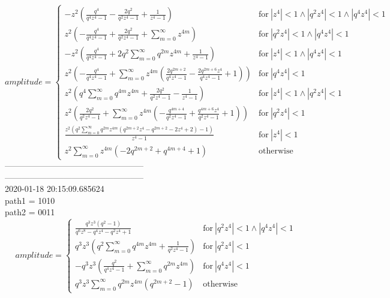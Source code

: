 \documentclass{jsreport}
\begin{document}
$$amplitude = \begin{cases} - z^{2} \left(\frac{q^{4}}{q^{4} z^{4} - 1} - \frac{2 q^{2}}{q^{2} z^{4} - 1} + \frac{1}{z^{4} - 1}\right) & \text{for}\: \left|{z^{4}}\right| < 1 \wedge \left|{q^{2} z^{4}}\right| < 1 \wedge \left|{q^{4} z^{4}}\right| < 1 \\z^{2} \left(- \frac{q^{4}}{q^{4} z^{4} - 1} + \frac{2 q^{2}}{q^{2} z^{4} - 1} + \sum_{m=0}^{\infty} z^{4 m}\right) & \text{for}\: \left|{q^{2} z^{4}}\right| < 1 \wedge \left|{q^{4} z^{4}}\right| < 1 \\- z^{2} \left(\frac{q^{4}}{q^{4} z^{4} - 1} + 2 q^{2} \sum_{m=0}^{\infty} q^{2 m} z^{4 m} + \frac{1}{z^{4} - 1}\right) & \text{for}\: \left|{z^{4}}\right| < 1 \wedge \left|{q^{4} z^{4}}\right| < 1 \\z^{2} \left(- \frac{q^{4}}{q^{4} z^{4} - 1} + \sum_{m=0}^{\infty} z^{4 m} \left(\frac{2 q^{2 m + 2}}{q^{4} z^{4} - 1} - \frac{2 q^{2 m + 6} z^{4}}{q^{4} z^{4} - 1} + 1\right)\right) & \text{for}\: \left|{q^{4} z^{4}}\right| < 1 \\z^{2} \left(q^{4} \sum_{m=0}^{\infty} q^{4 m} z^{4 m} + \frac{2 q^{2}}{q^{2} z^{4} - 1} - \frac{1}{z^{4} - 1}\right) & \text{for}\: \left|{z^{4}}\right| < 1 \wedge \left|{q^{2} z^{4}}\right| < 1 \\z^{2} \left(\frac{2 q^{2}}{q^{2} z^{4} - 1} + \sum_{m=0}^{\infty} z^{4 m} \left(- \frac{q^{4 m + 4}}{q^{2} z^{4} - 1} + \frac{q^{4 m + 6} z^{4}}{q^{2} z^{4} - 1} + 1\right)\right) & \text{for}\: \left|{q^{2} z^{4}}\right| < 1 \\\frac{z^{2} \left(q^{2} \sum_{m=0}^{\infty} q^{2 m} z^{4 m} \left(q^{2 m + 2} z^{4} - q^{2 m + 2} - 2 z^{4} + 2\right) - 1\right)}{z^{4} - 1} & \text{for}\: \left|{z^{4}}\right| < 1 \\z^{2} \sum_{m=0}^{\infty} z^{4 m} \left(- 2 q^{2 m + 2} + q^{4 m + 4} + 1\right) & \text{otherwise} \end{cases}$$
--------------------------------------------------\\
--------------------------------------------------\\
2020-01-18 20:15:09.685624\\
path1 = 1010\\
path2 = 0011\\
$$amplitude = \begin{cases} \frac{q^{3} z^{3} \left(q^{2} - 1\right)}{q^{6} z^{8} - q^{4} z^{4} - q^{2} z^{4} + 1} & \text{for}\: \left|{q^{2} z^{4}}\right| < 1 \wedge \left|{q^{4} z^{4}}\right| < 1 \\q^{3} z^{3} \left(q^{2} \sum_{m=0}^{\infty} q^{4 m} z^{4 m} + \frac{1}{q^{2} z^{4} - 1}\right) & \text{for}\: \left|{q^{2} z^{4}}\right| < 1 \\- q^{3} z^{3} \left(\frac{q^{2}}{q^{4} z^{4} - 1} + \sum_{m=0}^{\infty} q^{2 m} z^{4 m}\right) & \text{for}\: \left|{q^{4} z^{4}}\right| < 1 \\q^{3} z^{3} \sum_{m=0}^{\infty} q^{2 m} z^{4 m} \left(q^{2 m + 2} - 1\right) & \text{otherwise} \end{cases}$$
\end{document}
